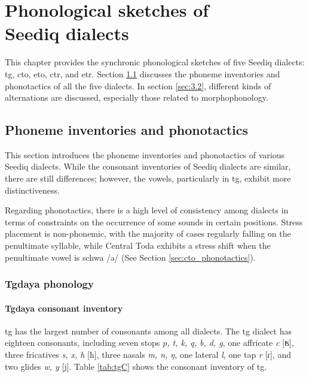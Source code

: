 \chapter[Phonological sketches of Seediq dialects]{Phonological sketches of \\ Seediq dialects}\label{ch3}

This chapter provides the synchronic phonological sketches of five Seediq dialects: \acl{tg}, \acl{cto}, \acl{eto}, \acl{ctr}, and \acl{etr}. Section \ref{sec:3.1} discusses the phoneme inventories and phonotactics of all the five dialects. In section \ref{sec:3.2}, different kinds of alternations are discussed, especially those related to morphophonology.

\section{Phoneme inventories and phonotactics} \label{sec:3.1}

This section introduces the phoneme inventories and phonotactics of various Seediq dialects. While the consonant inventories of Seediq dialects are similar, there are still differences; however, the vowels, particularly in \acl{tg}, exhibit more distinctiveness.

Regarding phonotactics, there is a high level of consistency among dialects in terms of constraints on the occurrence of some sounds in certain positions. Stress placement is non-phonemic, with the majority of cases regularly falling on the penultimate syllable, while Central Toda exhibits a stress shift when the penultimate vowel is schwa /ə/ (See Section \ref{sec:cto_phonotactics}).

\subsection{Tgdaya phonology}

\subsubsection{Tgdaya consonant inventory} \label{sec:tg_C}

\acl{tg} has the largest number of consonants among all dialects. The \acl{tg} dialect has eighteen consonants, including seven stops \textit{p, t, k, q, b, d, g}, one affricate \textit{c} [ʦ], three fricatives \textit{s, x, h} [ħ], three nasals \textit{m, n, ŋ}, one lateral \textit{l}, one tap \textit{r} [ɾ], and two glides \textit{w, y} [j]. Table \ref{tab:tgC} shows the consonant inventory of \acl{tg}.

